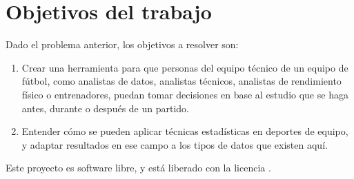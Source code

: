 \section{Objetivos del trabajo} \label{sect:goals}

Dado el problema anterior, los objetivos a resolver son:

\begin{enumerate}
    \item \label{obj:1} Crear una herramienta para que personas del equipo técnico de un equipo de fútbol, como analistas de datos, analistas técnicos, analistas de rendimiento 
    físico o entrenadores, puedan tomar decisiones en base al estudio que se haga antes, durante 
    o después de un partido. 
    \item \label{obj:2} Entender cómo se pueden aplicar técnicas estadísticas en deportes de equipo, y adaptar resultados en ese campo a 
    los tipos de datos que existen aquí.
\end{enumerate}

Este proyecto es software libre, y está liberado con la licencia \cite{gplv3}.
